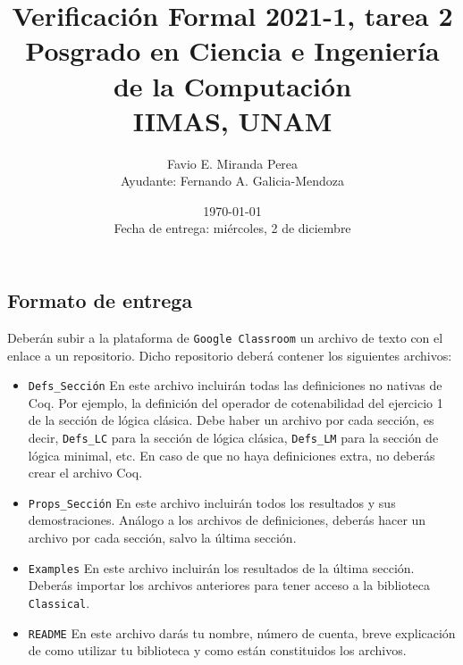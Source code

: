 \documentclass[letterpaper, 11 pt]{article}
\title{Verificación Formal 2021-1, tarea 2\\
Posgrado en Ciencia e Ingeniería de la Computación\\
IIMAS, UNAM}
\author{Favio E. Miranda Perea\\
Ayudante: Fernando A. Galicia-Mendoza}
\date{\today\\ Fecha de entrega: miércoles, 2 de diciembre}
\begin{document}
\maketitle

\subsection*{Formato de entrega}
Deberán subir a la plataforma de {\tt Google Classroom} un archivo de texto con el enlace a un repositorio. Dicho repositorio deberá  contener los siguientes archivos:
\begin{itemize}
    \item {\tt Defs\_\textlangle Sección\textrangle} En este archivo incluirán todas las definiciones no nativas de {\sf Coq}. Por ejemplo, la definición del operador de cotenabilidad del ejercicio 1 de la sección de lógica clásica. Debe haber un archivo por cada sección, es decir, {\tt Defs\_LC} para la sección de lógica clásica, {\tt Defs\_LM} para la sección de lógica minimal, etc. En caso de que no haya definiciones extra, no deberás crear el archivo {\sf Coq}.
    \item {\tt Props\_\textlangle Sección\textrangle} En este archivo incluirán todos los resultados y sus demostraciones. Análogo a los archivos de definiciones, deberás hacer un archivo por cada sección, salvo la última sección.
    \item {\tt Examples} En este archivo incluirán los resultados de la última sección. Deberás importar los archivos anteriores para tener acceso a la biblioteca {\tt Classical}.
    \item {\tt README} En este archivo darás tu nombre, número de cuenta, breve explicación de como utilizar tu biblioteca y como  están constituidos los archivos.
\end{itemize}
\end{document}
